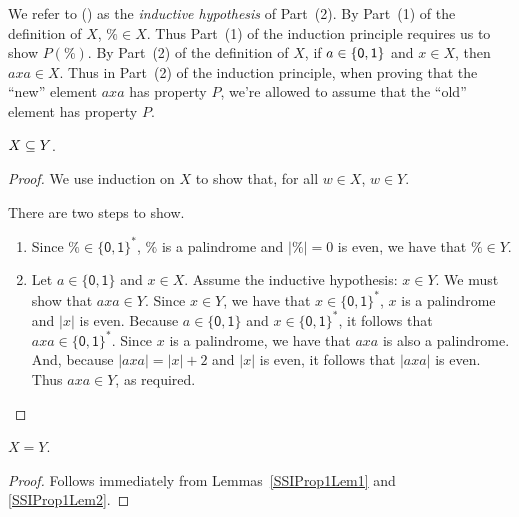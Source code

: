 We refer to (\dag) as the \emph{inductive hypothesis} of Part~(2).
By Part~(1) of the definition of $X$, $\%\in X$.  Thus Part~(1) of the
induction principle requires us to show $P(\%)$.  By Part~(2) of the
definition of $X$, if $a\in\{\mathsf{0},\mathsf{1}\}$ and $x\in X$, then
$axa\in X$.  Thus in Part~(2) of the induction principle, when proving
that the ``new'' element $axa$ has property $P$, we're allowed to
assume that the ``old'' element has property $P$.

\begin{lemma}
\label{SSIProp1Lem2}
$X\subseteq Y$.
\end{lemma}

\begin{proof}
We use induction on $X$ to show that, for all $w\in X$, $w\in Y$.

There are two steps to show.
\begin{enumerate}[\quad(1)]
\item Since $\%\in\{\mathsf{0,1}\}^*$, $\%$ is a palindrome and
  $|\%|=0$ is even, we have that $\%\in Y$.

\item Let $a\in\{\mathsf{0,1}\}$ and $x\in X$.  Assume the inductive
  hypothesis: $x\in Y$.  We must show that $axa\in Y$.  Since $x\in
  Y$, we have that $x\in\{\mathsf{0,1}\}^*$, $x$ is a palindrome and
  $|x|$ is even.  Because $a\in\{\mathsf{0,1}\}$ and
  $x\in\{\mathsf{0,1}\}^*$, it follows that
  $axa\in\{\mathsf{0,1}\}^*$.  Since $x$ is a palindrome, we have that
  $axa$ is also a palindrome.  And, because $|axa|=|x|+2$ and $|x|$ is
  even, it follows that $|axa|$ is even.  Thus $axa\in Y$, as
  required.
\end{enumerate}
\end{proof}

\begin{proposition}
\label{SSIProp1}
$X=Y$.
\end{proposition}

\begin{proof}
Follows immediately from Lemmas~\ref{SSIProp1Lem1} and \ref{SSIProp1Lem2}.
\end{proof}

